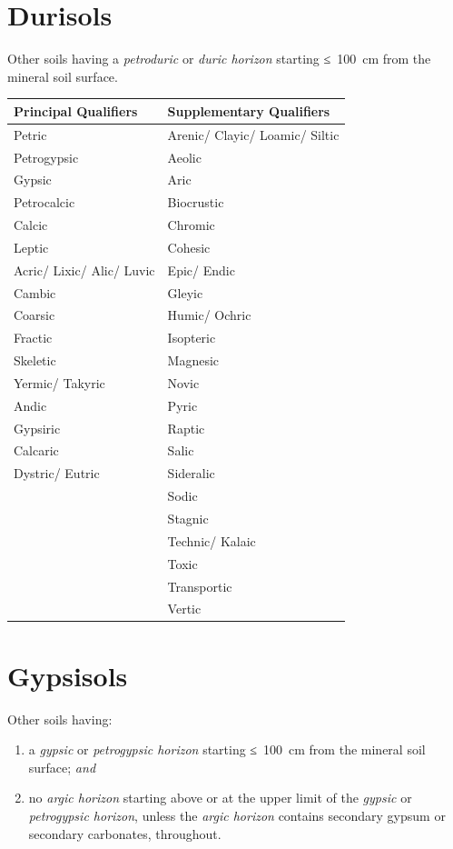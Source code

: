 \documentclass[
  letterpaper,
  DIV=11,
  numbers=noendperiod]{scrreprt}
\providecommand{\tightlist}{%
  \setlength{\itemsep}{0pt}\setlength{\parskip}{0pt}}\usepackage{longtable,booktabs,array}
\begin{document}

\hypertarget{key-durisols}{%
\chapter{Durisols}\label{key-durisols}}

Other soils having a \emph{petroduric} or \emph{duric horizon} starting
≤~100~cm from the mineral soil surface.

\begin{longtable}[]{@{}ll@{}}
\toprule()
Principal Qualifiers & Supplementary Qualifiers \\
\midrule()
\endhead
Petric & Arenic/ Clayic/ Loamic/ Siltic \\
Petrogypsic & Aeolic \\
Gypsic & Aric \\
Petrocalcic & Biocrustic \\
Calcic & Chromic \\
Leptic & Cohesic \\
Acric/ Lixic/ Alic/ Luvic & Epic/ Endic \\
Cambic & Gleyic \\
Coarsic & Humic/ Ochric \\
Fractic & Isopteric \\
Skeletic & Magnesic \\
Yermic/ Takyric & Novic \\
Andic & Pyric \\
Gypsiric & Raptic \\
Calcaric & Salic \\
Dystric/ Eutric & Sideralic \\
& Sodic \\
& Stagnic \\
& Technic/ Kalaic \\
& Toxic \\
& Transportic \\
& Vertic \\
\bottomrule()
\end{longtable}


\hypertarget{key-gypsisols}{%
\chapter{Gypsisols}\label{key-gypsisols}}

Other soils having:

\begin{enumerate}
\def\labelenumi{\arabic{enumi}.}
\tightlist
\item
  a \emph{gypsic} or \emph{petrogypsic horizon} starting ≤~100~cm from
  the mineral soil surface; \emph{and}
\item
  no \emph{argic horizon} starting above or at the upper limit of the
  \emph{gypsic} or \emph{petrogypsic horizon}, unless the \emph{argic
  horizon} contains secondary gypsum or secondary carbonates,
  throughout.
\end{enumerate}
\end{document}
